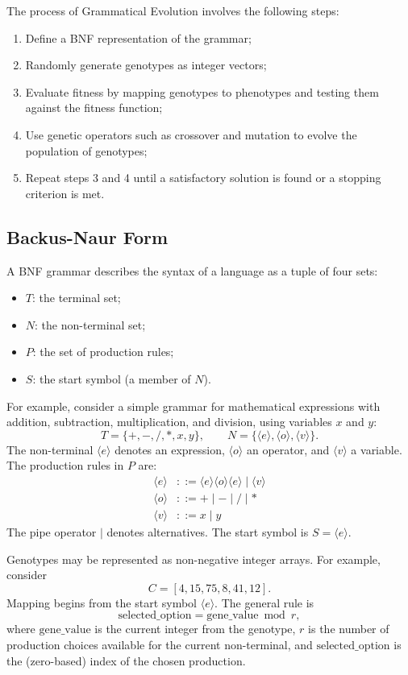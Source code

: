 The process of Grammatical Evolution involves the following steps:
\begin{enumerate}
    \item Define a \ac{BNF} representation of the grammar;
    \item Randomly generate genotypes as integer vectors;
    \item Evaluate fitness by mapping genotypes to phenotypes and testing them against the fitness function;
    \item Use genetic operators such as crossover and mutation to evolve the population of genotypes;
    \item Repeat steps 3 and 4 until a satisfactory solution is found or a stopping criterion is met.
\end{enumerate}

\subsection{Backus-Naur Form}

A \ac{BNF} grammar describes the syntax of a language as a tuple of four sets:
\begin{itemize}
    \item $T$: the terminal set;
    \item $N$: the non-terminal set;
    \item $P$: the set of production rules;
    \item $S$: the start symbol (a member of $N$).
\end{itemize}

For example, consider a simple grammar for mathematical expressions with addition, subtraction, multiplication, and division, using variables $x$ and $y$:
\[
T = \{+, -, /, *, x, y\}, \qquad
N = \{\langle e \rangle, \langle o \rangle, \langle v \rangle\}.
\]
The non-terminal $\langle e \rangle$ denotes an expression, $\langle o \rangle$ an operator, and $\langle v \rangle$ a variable.
The production rules in $P$ are:
\begin{align}
\langle e \rangle &::= \langle e \rangle \langle o \rangle \langle e \rangle \mid \langle v \rangle \\
\langle o \rangle &::= + \mid - \mid / \mid * \\
\langle v \rangle &::= x \mid y
\end{align}
The pipe operator $\mid$ denotes alternatives.
The start symbol is $S = \langle e \rangle$.

Genotypes may be represented as non-negative integer arrays.
For example, consider
\[
C = [4, 15, 75, 8, 41, 12].
\]
Mapping begins from the start symbol $\langle e \rangle$.
The general rule is
\[
\text{selected\_option} = \text{gene\_value} \bmod r,
\]
where $\text{gene\_value}$ is the current integer from the genotype, $r$ is the number of production choices available for the current non-terminal, and $\text{selected\_option}$ is the (zero-based) index of the chosen production.

